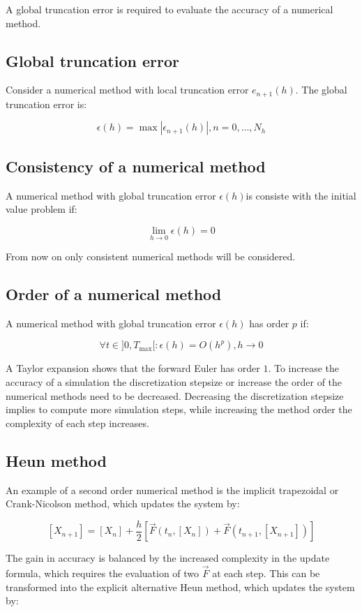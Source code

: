 A global truncation error is required to evaluate the accuracy of a numerical method.

  \subsection{Global truncation error}
  Consider a numerical method with local truncation error $e_{n+1}(h)$.
  The global truncation error is:

  $$\epsilon(h) = \max|\epsilon_{n+1}(h)|, n = 0, \dots, N_h$$

  \subsection{Consistency of a numerical method}
  A numerical method with global truncation error $\epsilon(h)$is consiste with the initial value problem if:

  $$\lim\limits_{h\rightarrow 0}\epsilon(h) = 0$$

  From now on only consistent numerical methods will be considered.

  \subsection{Order of a numerical method}
  A numerical method with global truncation error $\epsilon(h)$ has order $p$ if:

  $$\forall t\in]0, T_{\max}[: \epsilon(h) = O(h^p), h\rightarrow 0$$

  A Taylor expansion shows that the forward Euler has order $1$.
  To increase the accuracy of a simulation the discretization stepsize or increase the order of the numerical methods need to be decreased.
  Decreasing the discretization stepsize implies to compute more simulation steps, while increasing the method order the complexity of each step increases.

  \subsection{Heun method}
  An example of a second order numerical method is the implicit trapezoidal or Crank-Nicolson method, which updates the system by:

  $$[X_{n+1}] = [X_n] + \frac{h}{2}[\vec{F}(t_n, [X_n]) + \vec{F}(t_{n+1}, [X_{n+1}])]$$

  The gain in accuracy is balanced by the increased complexity in the update formula, which requires the evaluation of two $\vec{F}$ at each step.
  This can be transformed into the explicit alternative Heun method, which updates the system by:

